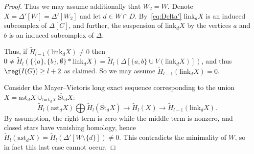 \begin{proof}
Thus we may assume additionally that
$W_2=W$. 
Denote $X=\Delta'[W]=\Delta'[W_2]$ and let $d\in W\cap D$.
By~\eqref{eq:Delta'} $\text{link}_d X$ is an induced subcomplex of $\Delta[C]$, and further, the suspension of $\text{link}_d X$ by the vertices $a$ and $b$ is an induced
subcomplex of $\Delta$.

Thus, if
$\widetilde{H}_{l-1}(\text{link}_d X)\neq 0$
then
$0\neq \widetilde{H}_l (\{\{a\},\{b\},\emptyset\}*\text{link}_d X)=\widetilde{H}_l(\Delta[\{a,b\}\cup V(\text{link}_d X)])$, and thus $\reg(I(G))\ge l+2$ as claimed. 
So we may assume $\widetilde{H}_{l-1}(\text{link}_d X)=0$.


Consider the Mayer--Vietoris long exact sequence
corresponding to the union
$X=\text{ast}_d X\cup_{\text{link}_d X} \bar{\text{St}}_d X$:
$$\widetilde{H}_l (\text{ast}_{d} X) \bigoplus \widetilde{H}_l (\overline{\text{St}}_{d} X) \longrightarrow \widetilde{H}_l (X) \longrightarrow \widetilde{H}_{l-1} (\text{link}_d X).$$
By assumption, the right term is zero while the middle term is nonzero, and closed stars have vanishing homology, hence
$\widetilde{H}_l (\text{ast}_{d} X)=
\widetilde{H}_l (\Delta'[W\setminus\{d\}])\neq 0$.
This contradicts the minimality of $W$, so in fact this last case cannot occur.
\end{proof}

